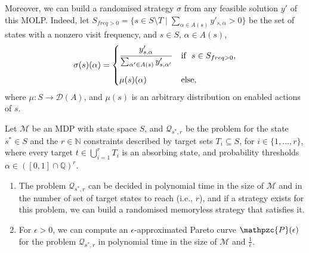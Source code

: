 Moreover, we can build a randomised strategy $\sigma$ from any feasible solution $y'$ of this MOLP.
Indeed, let $S_{freq>0} = \{ s \in S \setminus T \; | \;  \sum_{\alpha \in A(s)} y'_{s, \alpha} > 0 \} $ be the set of states with a nonzero visit frequency,
and $s \in S$, $\alpha \in A(s)$,
\begin{equation}
  \sigma(s)(\alpha) = \begin{dcases*}
    \frac{y'_{s, \alpha}}{\sum_{\alpha' \in A(s)} y'_{s, \alpha'}} & \text{if } $s \in S_{freq>0}$,\\[0.5em]
    \mu(s)(\alpha) & \text{else},
  \end{dcases*} \label{sigma_rand}
\end{equation}
where $\mu: S \rightarrow \mathcal{D}(A)$, and $\mu(s)$ is an arbitrary distribution on enabled actions of $s$.

\begin{corollary}\label{mosr-absorbing-cor}  Let $\mathcal{M}$ be an MDP with state space $S$,
and $\mathcal{Q}_{s^*, r}$ be the \MOSR{} problem for the state $s^* \in S$ and the $r \in \mathbb{N}$ constraints described by target sets $T_i \subseteq S$, for $i \in \{1, \dots, r\}$, where every target $t \in \bigcup_{i=1}^r T_i$ is an absorbing state, and probability thresholds $\alpha \in ([0, 1] \cap \mathbb{Q})^r$.
\begin{enumerate}[(a.)]
  \item The \MOSR{} problem $\mathcal{Q}_{s^*, r}$ can be decided in polynomial time in the size of $\mathcal{M}$ and in the number of set of target states to reach (i.e., $r$), and if a strategy exists for this problem, we can build a randomised memoryless strategy that satisfies it. \label{mosr-cor1}
  \item For $\epsilon > 0$, we can compute an $\epsilon$-approximated Pareto curve $\mathpzc{P}(\epsilon)$ for the \MOSR{} problem $\mathcal{Q}_{s^*, r}$ in polynomial time in the size of $\mathcal{M}$ and $\frac{1}{\epsilon}$. \label{mosr-cor2}
\end{enumerate}
\end{corollary}

